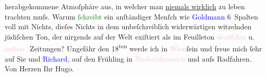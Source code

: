                herabgekommene Atmoſphäre {\pb}aus, in
               welcher man \uline{niemals wirklich} zu leben trachten
               muſs.\pend
           \pstart
           Warum \textcolor{green}{ſchreibt}{} ein anſtändiger
               Menſch wie \textcolor{blue}{Goldmann}{}\ledrightnote{\textcolor{blue}{Paul Goldmann}} 6 Spalten voll mit
               Nichts, dieſes Nichts in dem unbeſchreiblich widerwärtigen witzelnden jüdiſchen Ton,
               der nirgends auf der Welt exiſtiert als im Feuilleton \textcolor{pink}{deutſcher}{}\ledrightnote{\textcolor{pink}{Deutschland}} u. \textcolor{pink}{oeſterr.}{}\ledrightnote{\textcolor{pink}{Österreich}} Zeitungen? \pend
           \pstart
           {\pb}Ungefähr den 18\textsuperscript{ten} werde ich in \textcolor{pink}{Wien}{}\ledrightnote{\textcolor{pink}{Wien}}{ }ſein und freue mich ſehr auf Sie und \textcolor{blue}{Richard}{}\ledrightnote{\textcolor{blue}{Richard Beer-Hofmann}}, auf den Frühling in \textcolor{pink}{Niederöſterreich}{}\ledrightnote{\textcolor{pink}{Niederösterreich}} und aufs Radfahren.\pend
           \pstart Von Herzen Ihr \spacefill\mbox{Hugo.}\pend{}\endnumbering{}  
      